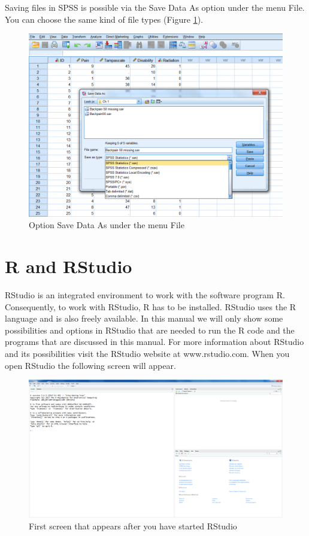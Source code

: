 \documentclass[]{book}
\begin{document}
Saving files in SPSS is possible via the Save Data As option under the
menu File. You can choose the same kind of file types (Figure
\ref{fig:fig9}).

\begin{figure}

{\centering \includegraphics[width=0.9\linewidth]{images/fig1.9} 

}

\caption{Option Save Data As under the menu File}\label{fig:fig9}
\end{figure}

\section{R and RStudio}\label{r-and-rstudio}

RStudio is an integrated environment to work with the software program
R. Consequently, to work with RStudio, R has to be installed. RStudio
uses the R language and is also freely available. In this manual we will
only show some possibilities and options in RStudio that are needed to
run the R code and the programs that are discussed in this manual. For
more information about RStudio and its possibilities visit the RStudio
website at www.rstudio.com. When you open RStudio the following screen
will appear.

\begin{figure}

{\centering \includegraphics[width=0.9\linewidth]{images/fig1.10} 

}

\caption{First screen that appears after you have started RStudio}\label{fig:fig10}
\end{figure}
\end{document}
